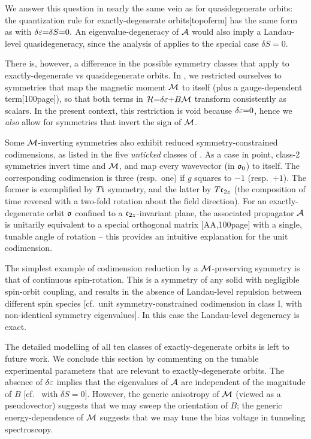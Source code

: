 \documentclass[aps, prb, showpacs, twocolumn, notitlepage, superscriptaddress]{revtex4-1}
\begin{document}
We answer this question in nearly the same vein as for quasidegenerate orbits: the quantization rule for exactly-degenerate orbits[topoferm] has the same form as  with $\delta \varepsilon{=}\delta S{=}0.$ An eigenvalue-degeneracy of ${\cal A}$ would also imply a Landau-level quasidegeneracy, since the analysis of  applies to the special case $\delta S{=}0$. 

There is, however, a difference in the possible symmetry classes that apply to exactly-degenerate vs quasidegenerate orbits.  In , we restricted ourselves to symmetries  that map the magnetic moment  ${\cal M}$ to itself (plus a gauge-dependent term[100page]), so that both terms in ${\cal H}{=}\delta \varepsilon{+}B{\cal M}$ transform consistently as scalars. In the present context, this restriction is void because $\delta\varepsilon{=}0$, hence we \textit{also} allow for symmetries that invert the sign of ${\cal M}$. 

Some ${\cal M}$-inverting symmetries also exhibit reduced symmetry-constrained codimensions, as listed in the five \textit{unticked} classes of . As a case in point, class-2 symmetries invert time and ${\cal M}$, and map  every wavevector (in $\mathfrak{o}_0$) to itself. The corresponding codimension is three (resp.\ one) if $g$ squares to $-1$ (resp.\ $+1$). The former is exemplified by $T\mathfrak{i}$ symmetry, and the latter by $T\mathfrak{c}_{2z}$ (the composition of time reversal with a two-fold rotation about the field direction). For an exactly-degenerate orbit $\mathfrak{o}$ confined to a $\mathfrak{c}_{2z}$-invariant plane, the associated propagator ${\cal A}$ is unitarily equivalent to a special orthogonal matrix [AA,100page] with a single, tunable angle of rotation -- this provides an intuitive explanation for the unit codimension.


The simplest example of codimension reduction by a ${\cal M}$-preserving symmetry is that of continuous spin-rotation. This is a symmetry of any solid with negligible spin-orbit coupling, and results in the absence of Landau-level repulsion between different spin species [cf.\ unit symmetry-constrained codimension in class I, with non-identical symmetry eigenvalues]. In this case the Landau-level degeneracy is exact.  

The detailed modelling of all ten classes of exactly-degenerate orbits is left to future work. We conclude this section by commenting on the tunable experimental parameters that are relevant to exactly-degenerate orbits. The absence of $\delta\varepsilon$  implies that the eigenvalues of ${\cal A}$ are independent of the magnitude of $B$ [cf.\  with $\delta S{=}0$]. However, the generic anisotropy of ${\cal M}$ (viewed as a pseudovector) suggests that we may sweep the orientation of $B$; the generic energy-dependence of ${\cal M}$ suggests that we may tune the bias voltage in tunneling spectroscopy.
\end{document}
